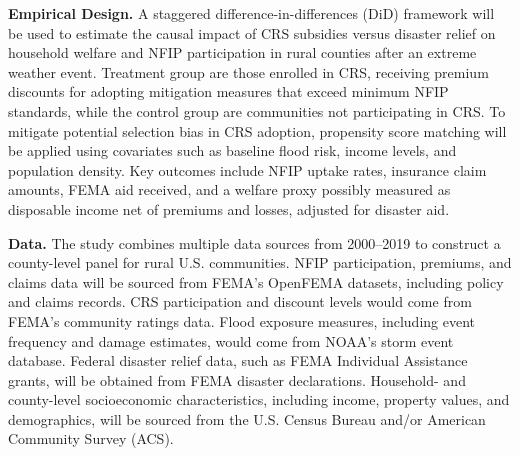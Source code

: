 \textbf{Empirical Design.} A staggered difference-in-differences (DiD) framework will be used to estimate the causal impact of CRS subsidies versus disaster relief on household welfare and NFIP participation in rural counties after an extreme weather event. Treatment group are those enrolled in CRS, receiving premium discounts for adopting mitigation measures that exceed minimum NFIP standards, while the control group are communities not participating in CRS. To mitigate potential selection bias in CRS adoption, propensity score matching will be applied using covariates such as baseline flood risk, income levels, and population density. Key outcomes include NFIP uptake rates, insurance claim amounts, FEMA aid received, and a welfare proxy possibly measured as disposable income net of premiums and losses, adjusted for disaster aid.

\textbf{Data.} The study combines multiple data sources from 2000–2019 to construct a county-level panel for rural U.S. communities. NFIP participation, premiums, and claims data will be sourced from FEMA’s OpenFEMA datasets, including policy and claims records. CRS participation and discount levels would come from FEMA’s community ratings data. Flood exposure measures, including event frequency and damage estimates, would come from NOAA’s storm event database. Federal disaster relief data, such as FEMA Individual Assistance grants, will be obtained from FEMA disaster declarations. Household- and county-level socioeconomic characteristics, including income, property values, and demographics, will be sourced from the U.S. Census Bureau and/or American Community Survey (ACS).




